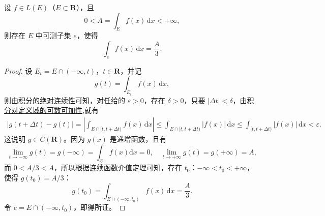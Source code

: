 \documentclass[../../main.tex]{subfiles}
\begin{document}
\begin{corollary}
设 $f \in L(E)$（$E \subset \mathbf{R}$），且
\[
0 < A = \int_E f(x) \, \mathrm{d}x < +\infty,
\]
则存在 $E$ 中可测子集 $e$，使得
\[
\int_e f(x) \, \mathrm{d}x = \frac{A}{3}.
\]
\end{corollary}
\begin{proof}
设 $E_t = E \cap (-\infty, t)$，$t \in \mathbf{R}$，并记
\[
g(t) = \int_{E_t} f(x) \, \mathrm{d}x,
\]
则由\hyperref[theorem:积分的绝对连续性]{积分的绝对连续性}可知，对任给的 $\varepsilon > 0$，存在 $\delta > 0$，只要 $|\Delta t| < \delta$，由\hyperref[theorem:积分对定义域的可数可加性]{积分对定义域的可数可加性},就有
\begin{align*}
|g(t+\Delta t)-g(t)|=\left| \int_{E\cap [t,t+\Delta t)}{f\left( x \right) \,\mathrm{d}x} \right|\leqslant \int_{E\cap [t,t+\Delta t)}{|f(x)|\,\mathrm{d}x}\leqslant \int_{[t,t+\Delta t)}{|f(x)|\,\mathrm{d}x}<\varepsilon .
\end{align*}
这说明 $g \in C(\mathbf{R})$。因为 $g(x)$ 是递增函数，且有
\[
\lim_{t\rightarrow -\infty} g(t)=g\left( -\infty \right) =\int_{\varnothing}{f\left( x \right) \mathrm{d}x}=0,\quad \lim_{t\rightarrow +\infty} g(t)=g\left( +\infty \right) =A,
\]
而 $0 < A/3 < A$，所以根据连续函数介值定理可知，存在 $t_0$：$-\infty < t_0 < +\infty$，使得 $g(t_0) = A/3$：
\[
g(t_0) = \int_{E \cap (-\infty, t_0)} f(x) \, \mathrm{d}x = \frac{A}{3}.
\]
令 $e = E \cap (-\infty, t_0)$，即得所证。
\end{proof}
\end{document}
